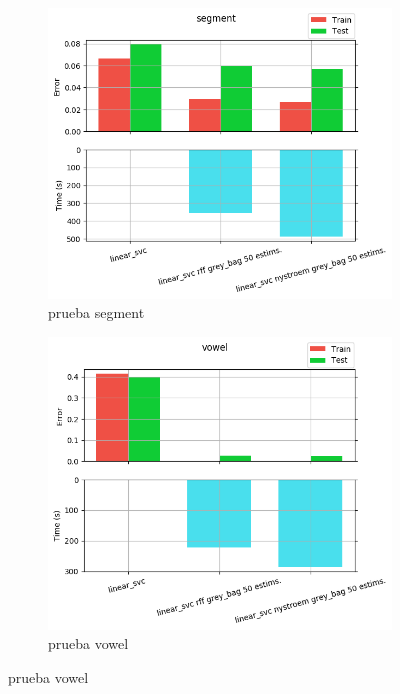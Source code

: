 \begin{figure}[ht]
  \centering
  \begin{subfigure}[b]{0.5\linewidth}
    \centering\includegraphics[width=\imgscale\linewidth]{Figures/2_7/segment}
    \caption{prueba segment}
    \label{fig:2_7_segment}
  \end{subfigure}%
  \begin{subfigure}[b]{0.5\linewidth}
    \centering\includegraphics[width=\imgscale\linewidth]{Figures/2_7/vowel}
    \caption{prueba vowel}
    \label{fig:2_7_vowel}
  \end{subfigure}
\end{figure}
